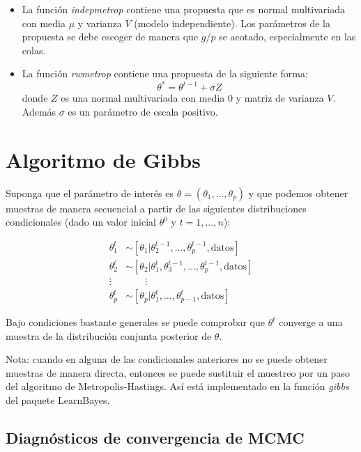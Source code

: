 \documentclass[
  12pt,
]{book}
\theoremstyle{definition}
\theoremstyle{definition}
\theoremstyle{definition}
\theoremstyle{definition}
\theoremstyle{remark}
\begin{document}
\begin{itemize}
\item
  La función \emph{indepmetrop} contiene una propuesta que es normal multivariada con media \(\mu\) y varianza \(V\) (modelo independiente). Los parámetros de la propuesta se debe escoger de manera que \(g/p\) se acotado, especialmente en las colas.
\item
  La función \emph{rwmetrop} contiene una propuesta de la siguiente forma:
  \[\theta^*=\theta^{t-1}+\sigma Z\]
  donde \(Z\) es una normal multivariada con media 0 y matriz de varianza \(V\). Además \(\sigma\) es un parámetro de escala positivo.
\end{itemize}

\hypertarget{algoritmo-de-gibbs}{%
\section{Algoritmo de Gibbs}\label{algoritmo-de-gibbs}}

Suponga que el parámetro de interés es \(\theta=(\theta_1,\ldots,\theta_p)\) y que podemos obtener muestras de manera secuencial a partir de las siguientes distribuciones condicionales (dado un valor inicial \(\theta^0\) y \(t=1,\ldots,n\)):

\begin{align*}
\theta_1^t&\sim [\theta_1|\theta_2^{t-1},\ldots,\theta_p^{t-1},\text{datos}]\\
\theta_2^t&\sim [\theta_2|\theta_1^t,\theta_3^{t-1},\ldots,\theta_p^{t-1},\text{datos}]\\
\vdots & \qquad \vdots\\
\theta_p^t&\sim [\theta_p|\theta_1^t,\ldots,\theta_{p-1}^t,\text{datos}]
\end{align*}

Bajo condiciones bastante generales se puede comprobar que \(\theta^t\) converge a una muestra de la distribución conjunta posterior de \(\theta\).

Nota: cuando en alguna de las condicionales anteriores no se puede obtener muestras de manera directa, entonces se puede sustituir el muestreo por un paso del algoritmo de Metropolis-Hastings. Así está implementado en la función \emph{gibbs} del paquete LearnBayes.

\hypertarget{diagnuxf3sticos-de-convergencia-de-mcmc}{%
\subsection{Diagnósticos de convergencia de MCMC}\label{diagnuxf3sticos-de-convergencia-de-mcmc}}
\end{document}
